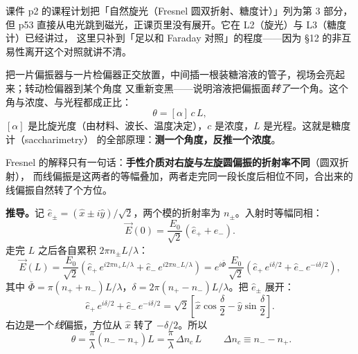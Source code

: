 \documentclass[11pt]{ctexart}
\let\subhdrtheme\subhdr
\renewcommand{\subhdr}[1]{\needspace{3\baselineskip}\subhdrtheme{#1}}
\let\hdrorig\hdr
\renewcommand{\hdr}[2]{\needspace{8\baselineskip}\hdrorig{#1}{#2}}
\begin{document}

{\small\color{inkgray}课件 p2 的课程计划把「自然旋光（Fresnel 圆双折射、糖度计）」列为第 3 部分，
但 p53 直接从电光跳到磁光，正课页里没有展开。它在 L2（旋光）与 L3（糖度计）已经讲过，
这里只补到「足以和 Faraday 对照」的程度——因为 §12 的非互易性离开这个对照就讲不清。}


把一片偏振器与一片检偏器正交放置，中间插一根装糖溶液的管子，视场会亮起来；转动检偏器到某个角度
又重新变黑——说明溶液把偏振面\emph{转了}一个角。这个角与浓度、与光程都成正比：
\begin{equation}
\label{eq:biot}
\theta=[\alpha]\,c\,L ,
\end{equation}
$[\alpha]$ 是比旋光度（由材料、波长、温度决定），$c$ 是浓度，$L$ 是光程。这就是糖度计（saccharimetry）
的全部原理：\textbf{测一个角度，反推一个浓度}。


Fresnel 的解释只有一句话：\textbf{手性介质对右旋与左旋圆偏振的折射率不同}（圆双折射），
而线偏振是这两者的等幅叠加，两者走完同一段长度后相位不同，合出来的线偏振自然转了个方位。

\textbf{推导。}记 $\hat e_\pm=(\hat x\pm i\hat y)/\sqrt2$，两个模的折射率为 $n_\pm$。入射时等幅同相：
\begin{equation}
\vec E(0)=\frac{E_0}{\sqrt2}\left(\hat e_+ +\hat e_-\right).
\end{equation}
走完 $L$ 之后各自累积 $2\pi n_\pm L/\lambda$：
\begin{equation}
\vec E(L)=\frac{E_0}{\sqrt2}\left(\hat e_+\,e^{i2\pi n_+L/\lambda}+\hat e_-\,e^{i2\pi n_-L/\lambda}\right)
=e^{i\bar\Phi}\,\frac{E_0}{\sqrt2}\left(\hat e_+\,e^{i\delta/2}+\hat e_-\,e^{-i\delta/2}\right),
\end{equation}
其中 $\bar\Phi=\pi(n_++n_-)L/\lambda$，$\delta=2\pi(n_+-n_-)L/\lambda$。把 $\hat e_\pm$ 展开：
\begin{equation}
\hat e_+\,e^{i\delta/2}+\hat e_-\,e^{-i\delta/2}
=\sqrt2\left[\hat x\cos\frac{\delta}{2}-\hat y\sin\frac{\delta}{2}\right].
\end{equation}
右边是一个\emph{线}偏振，方位从 $\hat x$ 转了 $-\delta/2$。所以
\begin{equation}
\label{eq:oa}
\boxed{\;\theta=\frac{\pi}{\lambda}\left(n_- -n_+\right)L=\frac{\pi}{\lambda}\,\Delta n_c\,L\;}
\qquad \Delta n_c\equiv n_- -n_+ .
\end{equation}
\end{document}
